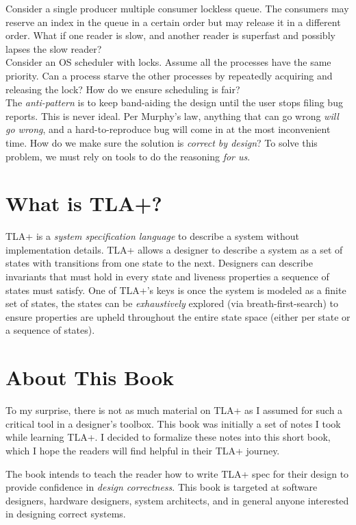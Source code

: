 Consider a single producer multiple consumer lockless queue. The consumers may
reserve an index in the queue in a certain order but may release it in a
different order. What if one reader is slow, and another reader is superfast
and possibly lapses the slow reader?\\

Consider an OS scheduler with locks. Assume all the processes have the same
priority. Can a process starve the other processes by repeatedly acquiring and
releasing the lock? How do we ensure scheduling is fair?\\

The \textit{anti-pattern} is to keep band-aiding the design until the user stops
filing bug reports. This is never ideal. Per Murphy's law, anything that can go
wrong \textit{will go wrong}, and a hard-to-reproduce bug will come in at the
most inconvenient time. How do we make sure the solution is \textit{correct by
design}? To solve this problem, we must rely on tools to do the reasoning
\textit{for us}.

\section{What is TLA+?}

TLA+ is a \textit{system specification language} to describe a system
without implementation details. TLA+ allows a designer to describe a system as a
set of states with transitions from one state to the next. Designers can
describe invariants that must hold in every state and liveness properties a
sequence of states must satisfy. One of TLA+'s keys is once the system is modeled
as a finite set of states, the states can be \textit{exhaustively} explored
(via breath-first-search) to ensure properties are upheld throughout the entire
state space (either per state or a sequence of states).

\section{About This Book}
To my surprise, there is not as much material on TLA+ as I assumed for
such a critical tool in a designer's toolbox. This book was initially a set of
notes I took while learning TLA+. I decided to formalize these notes into this
short book, which I hope the readers will find helpful in their TLA+
journey.\newline

The book intends to teach the reader how to write TLA+ spec for their design to
provide confidence in \textit{design correctness}. This book is targeted at
software designers, hardware designers, system architects, and in general anyone
interested in designing correct systems.\newline 

